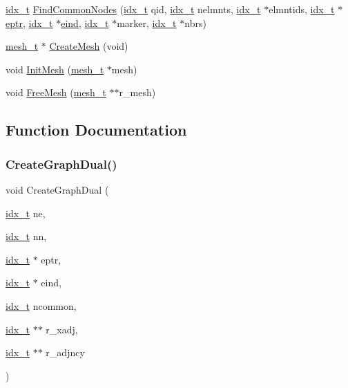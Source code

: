 \begin{DoxyCompactItemize}
\item 
\hyperlink{a00876_aaa5262be3e700770163401acb0150f52}{idx\+\_\+t} \hyperlink{a00927_aa3fb3adf98a0168ead1ff715114ebea1}{Find\+Common\+Nodes} (\hyperlink{a00876_aaa5262be3e700770163401acb0150f52}{idx\+\_\+t} qid, \hyperlink{a00876_aaa5262be3e700770163401acb0150f52}{idx\+\_\+t} nelmnts, \hyperlink{a00876_aaa5262be3e700770163401acb0150f52}{idx\+\_\+t} $\ast$elmntids, \hyperlink{a00876_aaa5262be3e700770163401acb0150f52}{idx\+\_\+t} $\ast$\hyperlink{a00879_af3ca47b5acd610d8d94e45e3480b2583}{eptr}, \hyperlink{a00876_aaa5262be3e700770163401acb0150f52}{idx\+\_\+t} $\ast$\hyperlink{a00879_af06d5753771b844d01c4c20e75c6401b}{eind}, \hyperlink{a00876_aaa5262be3e700770163401acb0150f52}{idx\+\_\+t} $\ast$marker, \hyperlink{a00876_aaa5262be3e700770163401acb0150f52}{idx\+\_\+t} $\ast$nbrs)
\item 
\hyperlink{a00738}{mesh\+\_\+t} $\ast$ \hyperlink{a00927_aec1a4bd83e832be7befbf6b03e9513ad}{Create\+Mesh} (void)
\item 
void \hyperlink{a00927_a82cd62ea70eaae4395fee538d40cf12b}{Init\+Mesh} (\hyperlink{a00738}{mesh\+\_\+t} $\ast$mesh)
\item 
void \hyperlink{a00927_af62123ffaba6a345198b3ec100bd9e18}{Free\+Mesh} (\hyperlink{a00738}{mesh\+\_\+t} $\ast$$\ast$r\+\_\+mesh)
\end{DoxyCompactItemize}


\subsection{Function Documentation}
\mbox{\label{a00927_a10400dffe4954a697990134da62b387d}} 
\subsubsection{\texorpdfstring{Create\+Graph\+Dual()}{CreateGraphDual()}}
{\footnotesize\ttfamily void Create\+Graph\+Dual (\begin{DoxyParamCaption}\item[{\hyperlink{a00876_aaa5262be3e700770163401acb0150f52}{idx\+\_\+t}}]{ne,  }\item[{\hyperlink{a00876_aaa5262be3e700770163401acb0150f52}{idx\+\_\+t}}]{nn,  }\item[{\hyperlink{a00876_aaa5262be3e700770163401acb0150f52}{idx\+\_\+t} $\ast$}]{eptr,  }\item[{\hyperlink{a00876_aaa5262be3e700770163401acb0150f52}{idx\+\_\+t} $\ast$}]{eind,  }\item[{\hyperlink{a00876_aaa5262be3e700770163401acb0150f52}{idx\+\_\+t}}]{ncommon,  }\item[{\hyperlink{a00876_aaa5262be3e700770163401acb0150f52}{idx\+\_\+t} $\ast$$\ast$}]{r\+\_\+xadj,  }\item[{\hyperlink{a00876_aaa5262be3e700770163401acb0150f52}{idx\+\_\+t} $\ast$$\ast$}]{r\+\_\+adjncy }\end{DoxyParamCaption})}

